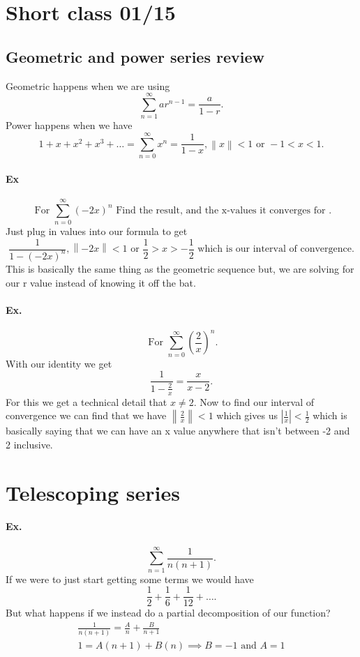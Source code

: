 \section{Short class 01/15}%
\label{sec:Short class 01/15}

\subsection{Geometric and power series review}%
\label{sub:Geometric and power series review}

Geometric happens when we are using 
\[
\sum_{ n=1 } ^{ \infty } ar^{ n-1 }=\frac{ a }{ 1-r } 
.\] 
Power happens when we have 
\[
1+x+x^2+x^3+\ldots=\sum_{ n=0 } ^{ \infty } x^{ n }=\frac{ 1 }{ 1-x } ,\left\| x \right\|<1 \text{ or }-1<x<1
.\] 

\paragraph{Ex}%
\label{par:Ex}
\[
\text{ For }\sum_{ n=0 } ^{ \infty } \left( -2x \right) ^{ n }\text{ Find the result, and the x-values it converges for }
.\] 
Just plug in values into our formula to get
\[
\frac{ 1 }{ 1-\left( -2x \right) ^{ n } }, \left\| -2x \right\|<1 \text{ or }\frac{ 1 }{ 2 } >x>-\frac{ 1 }{ 2 } \text{ which is our interval of convergence}
.\] 
This is basically the same thing as the geometric sequence but, we are solving for our r value instead of knowing it off the bat.

\paragraph{Ex.}
\[
\text{ For }\sum_{ n=0 } ^{ \infty } \left( \frac{ 2 }{ x }  \right) ^{ n }
.\]
With our identity we get
\[
\frac{ 1 }{ 1-\frac{ 2 }{ x }  } =\frac{ x }{ x-2 } 
.\] 
For this we get a technical detail that $ x\neq 2 $. Now to find our interval of convergence we can find that we have $ \left\| \frac{ 2 }{ x }  \right\|<1 $ which gives us $ \left| \frac{ 1 }{ x }  \right|<\frac{ 1 }{ 2 }   $ which is basically saying that we can have an x value anywhere that isn't between -2 and 2 inclusive. 

\section{Telescoping series}%
\label{sec:Telescoping series}
\paragraph{Ex.}%
\label{par:Ex.}
\[
\sum_{ n=1 } ^{ \infty } \frac{ 1 }{ n\left( n+1 \right)  } 
.\] 
If we were to just start getting some terms we would have
\[
\frac{ 1 }{ 2 } +\frac{ 1 }{ 6 } +\frac{ 1 }{ 12 } +\ldots
.\] 
But what happens if we instead do a partial decomposition of our function?
\begin{gather*}
\frac{ 1 }{ n\left( n+1 \right)  } =\frac{ A }{ n } +\frac{ B }{ n+1 } \\
1=A\left( n+1 \right) +B\left( n \right) \implies B = -1 \text{ and }A=1\\
\end{gather*}

